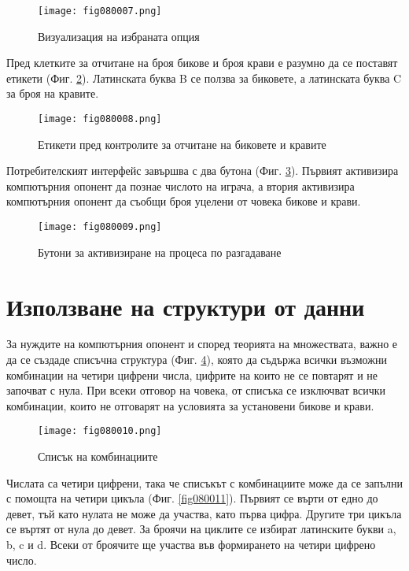\begin{figure}[H]
  \centering
  \texttt{[image: fig080007.png]}
  \caption{Визуализация на избраната опция}
\label{fig080007}
\end{figure}

Пред клетките за отчитане на броя бикове и броя крави е разумно да се поставят етикети (Фиг. \ref{fig080008}). Латинската буква B се ползва за биковете, а латинската буква C за броя на кравите. 

\begin{figure}[H]
  \centering
  \texttt{[image: fig080008.png]}
  \caption{Етикети пред контролите за отчитане на биковете и кравите}
\label{fig080008}
\end{figure}

Потребителският интерфейс завършва с два бутона (Фиг. \ref{fig080009}). Първият активизира компютърния опонент да познае числото на играча, а втория активизира компютърния опонент да съобщи броя уцелени от човека бикове и крави.

\begin{figure}[H]
  \centering
  \texttt{[image: fig080009.png]}
  \caption{Бутони за активизиране на процеса по разгадаване}
\label{fig080009}
\end{figure}

\section{Използване на структури от данни}

За нуждите на компютърния опонент и според теорията на множествата, важно е да се създаде списъчна структура (Фиг. \ref{fig080010}), която да съдържа всички възможни комбинации на четири цифрени числа, цифрите на които не се повтарят и не започват с нула. При всеки отговор на човека, от списъка се изключват всички комбинации, които не отговарят на условията за установени бикове и крави.

\begin{figure}[H]
  \centering
  \texttt{[image: fig080010.png]}
  \caption{Списък на комбинациите}
\label{fig080010}
\end{figure}

Числата са четири цифрени, така че списъкът с комбинациите може да се запълни с помощта на четири цикъла (Фиг. \ref{fig080011}). Първият се върти от едно до девет, тъй като нулата не може да участва, като първа цифра. Другите три цикъла се въртят от нула до девет. За броячи на циклите се избират латинските букви a, b, c и d. Всеки от броячите ще участва във формирането на четири цифрено число.

